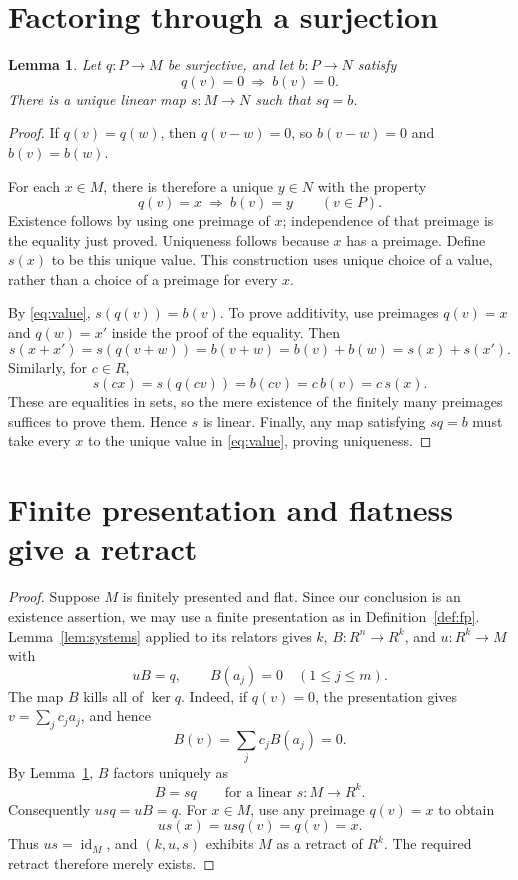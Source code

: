 \documentclass[11pt]{amsart}
\newtheorem{lemma}[theorem]{Lemma}
\theoremstyle{definition}
\newcommand{\id}{\operatorname{id}}
\begin{document}
\section{Factoring through a surjection}

\begin{lemma}\label{lem:factor}
Let $q:P\to M$ be surjective, and let $b:P\to N$ satisfy
\[
 q(v)=0\ \Longrightarrow\ b(v)=0.
\]
There is a unique linear map $s:M\to N$ such that $sq=b$.
\end{lemma}
\begin{proof}
If $q(v)=q(w)$, then $q(v-w)=0$, so $b(v-w)=0$ and $b(v)=b(w)$.

For each $x\in M$, there is therefore a unique $y\in N$ with the
property
\begin{equation}\label{eq:value}
 q(v)=x\ \Longrightarrow\ b(v)=y\qquad(v\in P).
\end{equation}
Existence follows by using one preimage of $x$; independence of that
preimage is the equality just proved. Uniqueness follows because $x$
has a preimage. Define $s(x)$ to be this unique value. This construction
uses unique choice of a value, rather than a choice of a preimage for
every $x$.

By \eqref{eq:value}, $s(q(v))=b(v)$. To prove additivity, use preimages
$q(v)=x$ and $q(w)=x'$ inside the proof of the equality. Then
\[
 s(x+x')=s(q(v+w))=b(v+w)=b(v)+b(w)=s(x)+s(x').
\]
Similarly, for $c\in R$,
\[
 s(cx)=s(q(cv))=b(cv)=c\,b(v)=c\,s(x).
\]
These are equalities in sets, so the mere existence of the finitely
many preimages suffices to prove them. Hence $s$ is linear.
Finally, any map satisfying $sq=b$ must take every $x$ to the unique
value in \eqref{eq:value}, proving uniqueness.
\end{proof}

\section{Finite presentation and flatness give a retract}

\begin{proof}
Suppose $M$ is finitely presented and flat. Since our conclusion is an
existence assertion, we may use a finite presentation as in
Definition~\ref{def:fp}. Lemma~\ref{lem:systems} applied to its relators
gives $k$, $B:R^n\to R^k$, and $u:R^k\to M$ with
\[
 uB=q,\qquad B(a_j)=0\quad(1\leq j\leq m).
\]
The map $B$ kills all of $\ker q$. Indeed, if $q(v)=0$, the presentation
gives $v=\sum_j c_j a_j$, and hence
\[
 B(v)=\sum_j c_j B(a_j)=0.
\]
By Lemma~\ref{lem:factor}, $B$ factors uniquely as
\[
 B=sq\qquad\text{for a linear }s:M\to R^k.
\]
Consequently $usq=uB=q$. For $x\in M$, use any preimage $q(v)=x$ to
obtain
\[
 us(x)=usq(v)=q(v)=x.
\]
Thus $us=\id_M$, and $(k,u,s)$ exhibits $M$ as a retract of $R^k$.
The required retract therefore merely exists.
\end{proof}
\end{document}
